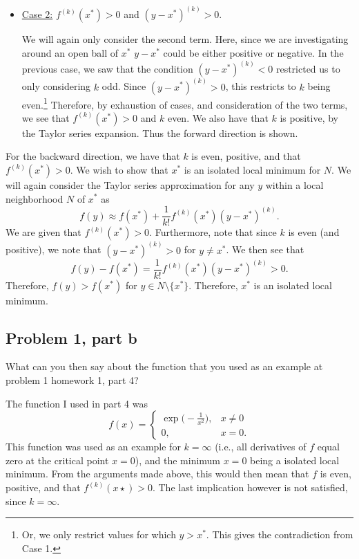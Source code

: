 \begin{solution}
\begin{itemize}
         \item \underline{Case 2:} $f^{(k)}(x^*) > 0$ and $(y - x^*)^{(k)} > 0$.

         \jump
         We will again only consider the second term. Here, since we are investigating around an open ball of $x^*$ $y - x^*$ could be either positive or negative. In the previous case, we saw that the condition $(y - x^*)^{(k)} < 0$ restricted us to only considering $k$ odd. Since $(y - x^*)^{(k)} > 0$, this restricts to $k$ being even.\footnote{Or, we only restrict values for which $y > x^*$. This gives the contradiction from Case 1.} Therefore, by exhaustion of cases, and consideration of the two terms, we see that $f^{(k)}(x^*) > 0$ and $k$ even. We also have that $k$ is positive, by the Taylor series expansion. Thus the forward direction is shown.
     \end{itemize}

     \jump
     For the backward direction, we have that $k$ is even, positive, and that $f^{(k)}(x^*) > 0$. We wish to show that $x^*$ is an isolated local minimum for $N$. We will again consider the Taylor series approximation for any $y$ within a local neighborhood $N$ of $x^*$ as 
     \[f(y) \approx f(x^*) + \frac{1}{k!}f^{(k)}(x^*)(y - x^*)^{(k)}.\]
     We are given that $f^{(k)}(x^*) > 0$. Furthermore, note that since $k$ is even (and positive), we note that $(y - x^*)^{(k)} > 0$ for $y \neq x^*$. We then see that  
     \[f(y) - f(x^*) = \frac{1}{k!}f^{(k)}(x^*)(y - x^*)^{(k)} > 0.\]
     Therefore, $f(y) > f(x^*)$ for $y \in N\setminus\{x^*\}$. Therefore, $x^*$ is an isolated local minimum. 
\end{solution}
\newpage
\subsection{Problem 1, part b}
What can you then say about the function that you used as an example at problem 1 homework 1, part 4?
\partbreak
\begin{solution}

    The function I used in part 4 was 
    \[
    f(x) = \begin{cases}
        \exp\Big( -\frac{1}{x^2}\Big), &x \neq 0\\
        0, &x = 0.
    \end{cases}
    \]
    This function was used as an example for $k = \infty$ (i.e., all derivatives of $f$ equal zero at the critical point $x = 0$), and the minimum $x = 0$ being a isolated local minimum. From the arguments made above, this would then mean that $f$ is even, positive, and that $f^{(k)}(x\star) > 0$. The last implication however is not satisfied, since $k = \infty$.  
\end{solution}

